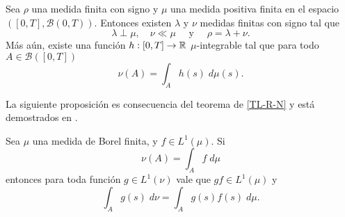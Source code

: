 \begin{thm}\label{TL-R-N}
	Sea $\rho$ una medida finita con signo y $\mu$ una medida positiva finita en el espacio $\left( [0,T], \mathscr{B}({0,T})\right) $. Entonces existen $\lambda$ y $\nu$ medidas finitas con signo tal que 
	\begin{equation*}
		\lambda\perp\mu, \quad \nu\ll\mu  \quad \text{ y }\quad \rho=\lambda+\nu.
	\end{equation*}
Más aún, existe una función $h:[0,T]\to\mathbb{R}$ $\mu$-integrable tal que para todo $A\in \mathscr{B}([0,T])$
\begin{equation*}
	\nu(A)=\int_A h(s)\;d\mu(s).
\end{equation*}
\end{thm}
La siguiente proposición es consecuencia del teorema de \ref{TL-R-N} y está demostrados en \cite[Proposición 3.9]{folland}.
\begin{prop}
    \label{ob1}
	Sea $\mu$ una medida de Borel finita, y $f\in L^1(\mu)$. Si   $$\nu(A)=\int_A f\; d\mu$$ entonces para toda función $g\in L^1(\nu)$ vale que $gf\in L^1(\mu)$ y 
	\begin{equation*}
	    \int_A g(s)\;d\nu=\int_Ag(s)f(s)\;d\mu.
	\end{equation*}

\end{prop}



